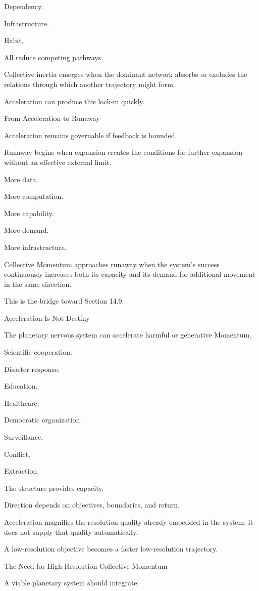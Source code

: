 Dependency.

Infrastructure.

Habit.

All reduce competing pathways.

Collective inertia emerges when the dominant network absorbs or excludes the relations through which another trajectory might form.

Acceleration can produce this lock-in quickly.

From Acceleration to Runaway

Acceleration remains governable if feedback is bounded.

Runaway begins when expansion creates the conditions for further expansion without an effective external limit.

More data.

More computation.

More capability.

More demand.

More infrastructure.

Collective Momentum approaches runaway when the system’s success continuously increases both its capacity and its demand for additional movement in the same direction.

This is the bridge toward Section 14.9.

Acceleration Is Not Destiny

The planetary nervous system can accelerate harmful or generative Momentum.

Scientific cooperation.

Disaster response.

Education.

Healthcare.

Democratic organization.

Surveillance.

Conflict.

Extraction.

The structure provides capacity.

Direction depends on objectives, boundaries, and return.

Acceleration magnifies the resolution quality already embedded in the system; it does not supply that quality automatically.

A low-resolution objective becomes a faster low-resolution trajectory.

The Need for High-Resolution Collective Momentum

A viable planetary system should integrate:

